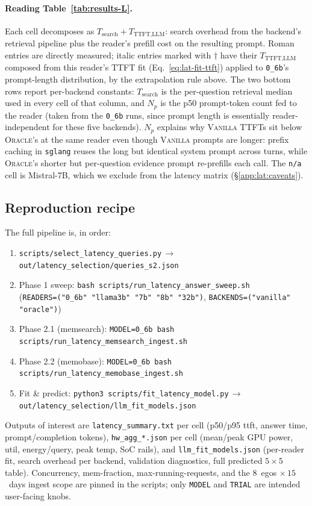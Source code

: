 \paragraph{Reading Table~\ref{tab:results-L}.}
Each cell decomposes as $T_{\text{search}} + T_{\text{TTFT,LLM}}$:
search overhead from the backend's retrieval pipeline plus the reader's
prefill cost on the resulting prompt. Roman entries are directly
measured; italic entries marked with $\dagger$ have their
$T_{\text{TTFT,LLM}}$ composed from this reader's TTFT fit
(Eq.~\ref{eq:lat-fit-ttft}) applied to \texttt{0\_6b}'s prompt-length
distribution, by the extrapolation rule above. The two bottom rows
report per-backend constants: $T_{\text{search}}$ is the per-question
retrieval median used in every cell of that column, and $N_p$ is the
p50 prompt-token count fed to the reader (taken from the \texttt{0\_6b}
runs, since prompt length is essentially reader-independent for these
five backends). $N_p$ explains why
\textsc{Vanilla} TTFTs sit below \textsc{Oracle}'s at the same reader
even though \textsc{Vanilla} prompts are longer: prefix caching in
\texttt{sglang} reuses the long but identical system prompt across
turns, while \textsc{Oracle}'s shorter but per-question evidence
prompt re-prefills each call. The \texttt{n/a} cell is Mistral-7B,
which we exclude from the latency matrix
(\S\ref{app:lat:caveats}).



\subsection{Reproduction recipe}
\label{app:lat:repro}

The full pipeline is, in order:
\begin{enumerate}
\setlength{\itemsep}{0pt}
\item \texttt{scripts/select\_latency\_queries.py}\,$\to$\,\texttt{out/latency\_selection/queries\_s2.json}
\item Phase 1 sweep:
  \texttt{bash scripts/run\_latency\_answer\_sweep.sh} \\(\texttt{READERS=("0\_6b" "llama3b" "7b" "8b" "32b")}, \texttt{BACKENDS=("vanilla" "oracle")})
\item Phase 2.1 (memsearch):
  \texttt{MODEL=0\_6b bash scripts/run\_latency\_memsearch\_ingest.sh}
\item Phase 2.2 (memobase):
  \texttt{MODEL=0\_6b bash scripts/run\_latency\_memobase\_ingest.sh}
\item Fit \& predict: \texttt{python3 scripts/fit\_latency\_model.py}\,$\to$\,\texttt{out/latency\_selection/llm\_fit\_models.json}
\end{enumerate}
Outputs of interest are \texttt{latency\_summary.txt} per cell (p50/p95
ttft, answer time, prompt/completion tokens), \texttt{hw\_agg\_*.json}
per cell (mean/peak GPU power, util, energy/query, peak temp, SoC
rails), and \texttt{llm\_fit\_models.json} (per-reader fit, search
overhead per backend, validation diagnostics, full predicted $5\!\times\!5$
table). Concurrency, mem-fraction, max-running-requests, and the
$8$~egos $\times\,15$~days ingest scope are pinned in the scripts; only
\texttt{MODEL} and \texttt{TRIAL} are intended user-facing knobs.

